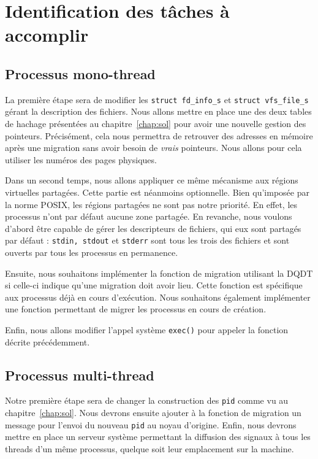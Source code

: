 \chapter{Identification des tâches à accomplir}
\label{chap:tasks}


  \section{Processus mono-thread}

    La première étape sera de modifier les \texttt{struct fd\_info\_s} et
    \texttt{struct vfs\_file\_s} gérant la description des fichiers. Nous allons
    mettre en place une des deux tables de hachage présentées au
    chapitre~\ref{chap:sol} pour avoir une nouvelle gestion des
    pointeurs. Précisément, cela nous permettra de retrouver des adresses en
    mémoire après une migration sans avoir besoin de \textit{vrais}
    pointeurs. Nous allons pour cela utiliser les numéros des pages physiques.

    Dans un second temps, nous allons appliquer ce même mécanisme aux régions
    virtuelles partagées. Cette partie est néanmoins optionnelle. Bien
    qu'imposée par la norme POSIX, les régions partagées ne sont pas notre
    priorité. En effet, les processus n'ont par défaut aucune zone partagée. En
    revanche, nous voulons d'abord être capable de gérer les descripteurs de
    fichiers, qui eux sont partagés par défaut : \texttt{stdin, stdout} et
    \texttt{stderr} sont tous les trois des fichiers et sont ouverts par tous
    les processus en permanence.

    Ensuite, nous souhaitons implémenter la fonction de migration utilisant la
    DQDT si celle-ci indique qu'une migration doit avoir lieu. Cette fonction
    est spécifique aux processus déjà en cours d'exécution. Nous souhaitons
    également implémenter une fonction permettant de migrer les processus en
    cours de création.
    
    Enfin, nous allons modifier l'appel système \texttt{exec()} pour appeler la
    fonction décrite précédemment.


  \section{Processus multi-thread}

    Notre première étape sera de changer la construction des \texttt{pid} comme
    vu au chapitre~\ref{chap:sol}. Nous devrons ensuite ajouter à la fonction de
    migration un message pour l'envoi du nouveau \texttt{pid} au noyau
    d'origine. Enfin, nous devrons mettre en place un serveur système permettant
    la diffusion des signaux à tous les threads d'un même processus, quelque
    soit leur emplacement sur la machine.

